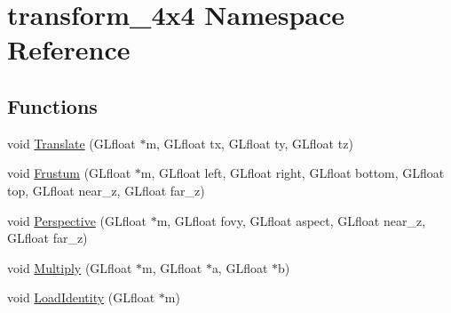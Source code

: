 \hypertarget{namespacetransform__4x4}{
\section{transform\_\-4x4 Namespace Reference}
\label{namespacetransform__4x4}
}
\subsection*{Functions}
\begin{DoxyCompactItemize}
\item 
void \hyperlink{namespacetransform__4x4_afd7c145427052a8736d91ef09b4aa86b}{Translate} (GLfloat $\ast$m, GLfloat tx, GLfloat ty, GLfloat tz)
\item 
void \hyperlink{namespacetransform__4x4_a581de72ba4913dbb2a8a85cab5882a28}{Frustum} (GLfloat $\ast$m, GLfloat left, GLfloat right, GLfloat bottom, GLfloat top, GLfloat near\_\-z, GLfloat far\_\-z)
\item 
void \hyperlink{namespacetransform__4x4_a67de7f42889f0ff1f097fe5a6ee740a8}{Perspective} (GLfloat $\ast$m, GLfloat fovy, GLfloat aspect, GLfloat near\_\-z, GLfloat far\_\-z)
\item 
void \hyperlink{namespacetransform__4x4_a003d8210c29ad26745f4a0fcd24a6dbe}{Multiply} (GLfloat $\ast$m, GLfloat $\ast$a, GLfloat $\ast$b)
\item 
void \hyperlink{namespacetransform__4x4_a292d65d7bd5a944aae8f7e1dc4bebc77}{LoadIdentity} (GLfloat $\ast$m)
\end{DoxyCompactItemize}



